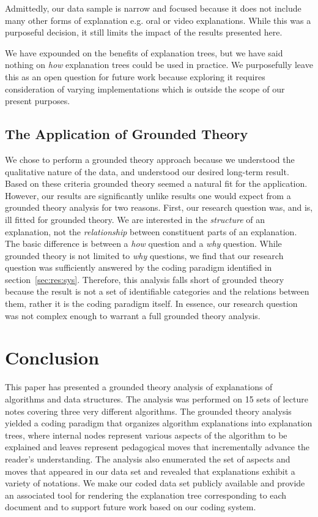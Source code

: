 \documentclass[sigconf]{acmart}
\begin{document}
Admittedly, our data sample is narrow and focused because it does not include
many other forms of explanation e.g. oral or video explanations. While this was
a purposeful decision, it still limits the impact of the results presented here.

We have expounded on the benefits of explanation trees, but we have said nothing
on \textit{how} explanation trees could be used in practice. We purposefully
leave this as an open question for future work because exploring it requires
consideration of varying implementations which is outside the scope of our
present purposes.

\subsection{The Application of Grounded Theory}
We chose to perform a grounded theory approach because we understood the
qualitative nature of the data, and understood our desired long-term result.
Based on these criteria grounded theory seemed a natural fit for the
application. However, our results are significantly unlike results one would
expect from a grounded theory analysis for two reasons. First, our research
question was, and is, ill fitted for grounded theory. We are interested in the
\textit{structure} of an explanation, not the \textit{relationship} between
constituent parts of an explanation. The basic difference is between a
\textit{how} question and a \textit{why} question. While grounded theory is not
limited to \textit{why} questions, we find that our research question was
sufficiently answered by the coding paradigm identified in
section~\ref{sec:res:sys}. Therefore, this analysis falls short of grounded
theory because the result is not a set of identifiable categories and the
relations between them, rather it is the coding paradigm itself. In essence, our
research question was not complex enough to warrant a full grounded theory
analysis.


\section{Conclusion}
\label{sec:conc}

This paper has presented a grounded theory analysis of explanations of
algorithms and data structures. The analysis was performed on 15 sets of
lecture notes covering three very different algorithms.
%
The grounded theory analysis yielded a coding paradigm that organizes algorithm
explanations into explanation trees, where internal nodes represent various
aspects of the algorithm to be explained and leaves represent pedagogical moves
that incrementally advance the reader's understanding. The analysis also
enumerated the set of aspects and moves that appeared in our data set and
revealed that explanations exhibit a variety of notations.
%
We make our coded data set publicly available and provide an associated tool
for rendering the explanation tree corresponding to each document and to
support future work based on our coding system.
\end{document}
